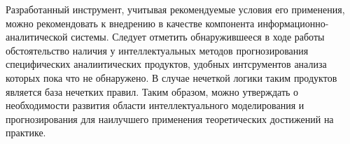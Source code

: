 Разработанный инструмент, учитывая рекомендуемые условия его применения,  можно
рекомендовать к внедрению в качестве компонента информационно-аналитической
системы. Следует отметить обнаружившееся в ходе работы обстоятельство наличия у
интеллектуальных методов прогнозирования специфических аналиитических продуктов,
удобных интсрументов анализа которых пока что не обнаружено. В случае нечеткой
логики таким продуктов является база нечетких правил. Таким образом, можно
утверждать о необходимости развития области интеллектуального моделирования и
прогнозирования для наилучшего применения теоретических достижений на практике.
